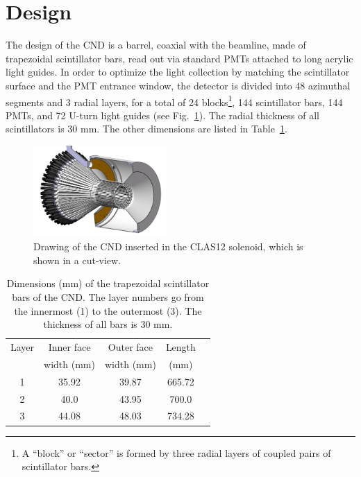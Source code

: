 \section{Design}

The design of the CND is a barrel, coaxial with the beamline, made of trapezoidal scintillator bars, read out via standard PMTs attached to long acrylic light guides. In order to optimize the light collection by matching the scintillator surface and the PMT entrance window, the detector is divided into 48 azimuthal segments and 3 radial layers, for a total of 24 blocks\footnote{A ``block'' or ``sector'' is formed by three radial layers of coupled pairs of scintillator bars.}, 144 scintillator bars, 144 PMTs, and 72 U-turn light guides (see Fig.~\ref{lab_CND_pic}). The radial thickness of all scintillators is 30 mm. The other dimensions are listed in Table~\ref{lab_scint_dim}.

\begin{figure}[htb]
  \centering
    \includegraphics[width=0.45\textwidth]{Figure/CND_pic.jpg}
 \caption{Drawing of the CND inserted in the CLAS12 solenoid, which is shown in a cut-view.}
    \label{lab_CND_pic}
\end{figure}

\begin{table}[tbph]
\centering
\begin{tabular}{|c|c|c|c|c|}
\hline
Layer & Inner face & Outer face  & Length\\
 & width (mm) & width (mm) & (mm)\\
\hline
1 & 35.92 & 39.87 & 665.72 \\
2 & 40.0 & 43.95 & 700.0 \\
3 & 44.08 & 48.03 & 734.28 \\
\hline
\end{tabular}
\caption{Dimensions (mm) of the trapezoidal scintillator bars of the CND. The layer numbers go from the innermost (1) to the outermost (3). The thickness of all bars is 30 mm.}
\label{lab_scint_dim}

\end{table}
